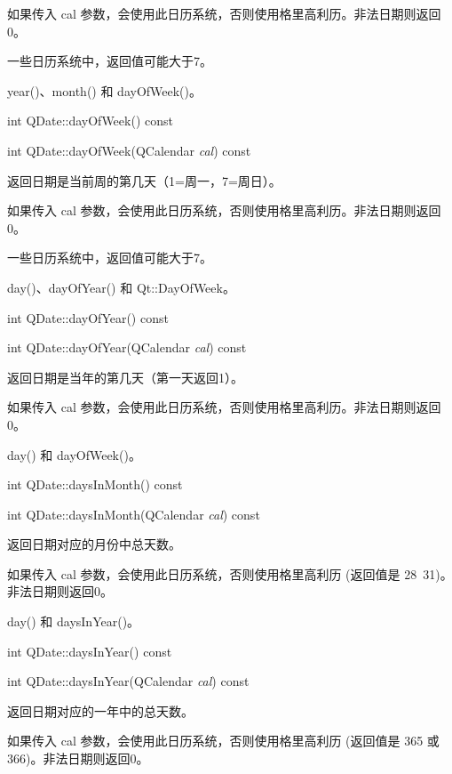 如果传入 cal 参数，会使用此日历系统，否则使用格里高利历。非法日期则返回0。

一些日历系统中，返回值可能大于7。

\begin{seeAlso}
year()、month() 和 dayOfWeek()。
\end{seeAlso}

\splitLine

int QDate::dayOfWeek() const

int QDate::dayOfWeek(QCalendar \emph{cal}) const

返回日期是当前周的第几天（1=周一，7=周日）。

如果传入 cal 参数，会使用此日历系统，否则使用格里高利历。非法日期则返回0。

一些日历系统中，返回值可能大于7。

\begin{seeAlso}
day()、dayOfYear() 和 Qt::DayOfWeek。
\end{seeAlso}

\splitLine

int QDate::dayOfYear() const

int QDate::dayOfYear(QCalendar \emph{cal}) const

返回日期是当年的第几天（第一天返回1）。

如果传入 cal 参数，会使用此日历系统，否则使用格里高利历。非法日期则返回0。

\begin{seeAlso}
day() 和 dayOfWeek()。
\end{seeAlso}

\splitLine

int QDate::daysInMonth() const

int QDate::daysInMonth(QCalendar \emph{cal}) const

返回日期对应的月份中总天数。

如果传入 cal 参数，会使用此日历系统，否则使用格里高利历 (返回值是 28~31)。非法日期则返回0。



\begin{seeAlso}
day() 和 daysInYear()。
\end{seeAlso}

\splitLine

int QDate::daysInYear() const

int QDate::daysInYear(QCalendar \emph{cal}) const

返回日期对应的一年中的总天数。

如果传入 cal 参数，会使用此日历系统，否则使用格里高利历 (返回值是 365 或 366)。非法日期则返回0。



